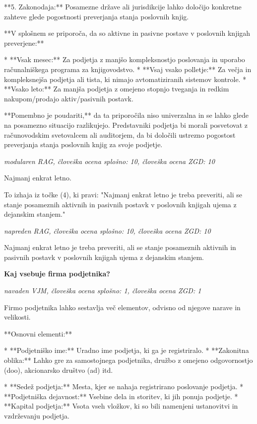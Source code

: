 \documentclass[a4paper,12pt,openright]{book}
\begin{document}
**5. Zakonodaja:** Posamezne države ali jurisdikcije lahko določijo konkretne zahteve glede pogostnosti preverjanja stanja poslovnih knjig.

**V splošnem se priporoča, da so aktivne in pasivne postave v poslovnih knjigah preverjene:**

* **Vsak mesec:** Za podjetja z manjšo kompleksnostjo poslovanja in uporabo računalniškega programa za knjigovodstvo.
* **Vsaj vsako polletje:** Za večja in kompleksnejša podjetja ali tista, ki nimajo avtomatiziranih sistemov kontrole.
* **Vsako leto:** Za manjša podjetja z omejeno stopnjo tveganja in redkim nakupom/prodajo aktiv/pasivnih postavk.

**Pomembno je poudariti,** da ta priporočila niso univerzalna in se lahko glede na posamezno situacijo razlikujejo. Predstavniki podjetja bi morali posvetovat z računovodskim svetovalcem ali auditorjem, da bi določili ustrezno pogostost preverjanja stanja poslovnih knjig za svoje podjetje.

\vspace{0.5cm}
\textit{modularen RAG, človeška ocena splošno: 10, človeška ocena ZGD: 10}

Najmanj enkrat letno.


To izhaja iz točke (4), ki pravi: "Najmanj enkrat letno je treba preveriti, ali se stanje posameznih aktivnih in pasivnih postavk v poslovnih knjigah ujema z dejanskim stanjem."

\vspace{0.5cm}
\textit{napreden RAG, človeška ocena splošno: 10, človeška ocena ZGD: 10}

Najmanj enkrat letno je treba preveriti, ali se stanje posameznih aktivnih in pasivnih postavk v poslovnih knjigah ujema z dejanskim stanjem.

\vspace{0.5cm}
\textbf{Kaj vsebuje firma podjetnika?}

\textit{navaden VJM, človeška ocena splošno: 1, človeška ocena ZGD: 1}

Firmo podjetnika lahko sestavlja več elementov, odvisno od njegove narave in velikosti.

**Osnovni elementi:**

* **Podjetniško ime:** Uradno ime podjetja, ki ga je registriralo.
* **Zakonitna oblika:** Lahko gre za samostojnega podjetnika, družbo z omejeno odgovornostjo (doo), akcionarsko društvo (ad) itd.

* **Sedež podjetja:** Mesta, kjer se nahaja registrirano poslovanje podjetja.
* **Podjetniška dejavnost:** Vsebine dela in storitev, ki jih ponuja podjetje.
* **Kapital podjetja:**  Vsota vseh vložkov, ki so bili namenjeni ustanovitvi in vzdrževanju podjetja.
\end{document}

